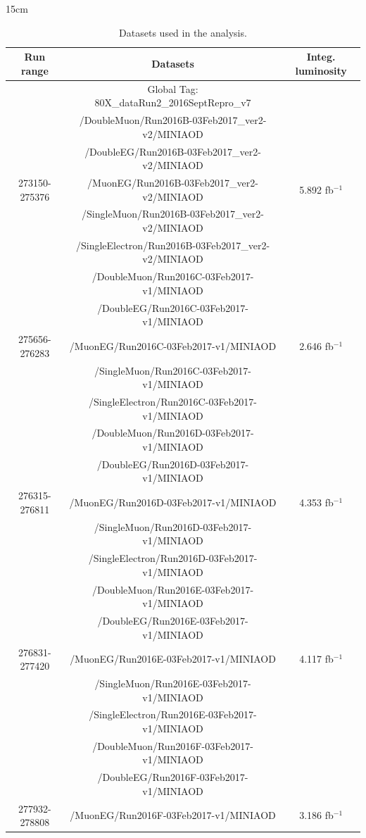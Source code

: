 \begin{table}[htbp]{15cm}
	\caption{Datasets used in the analysis.}
	\footnotesize
	\centering
	\begin{tabular}{c|c|c}
		\hline
		\rowcolor{light_gray}
		Run range & Datasets & Integ. luminosity\\
		\hline
		& Global Tag: 80X\_dataRun2\_2016SeptRepro\_v7 &\\
		\hline 
        & /DoubleMuon/Run2016B-03Feb2017\_ver2-v2/MINIAOD &\\
		& /DoubleEG/Run2016B-03Feb2017\_ver2-v2/MINIAOD	&\\
		273150-275376 & /MuonEG/Run2016B-03Feb2017\_ver2-v2/MINIAOD	& 5.892 fb$^{−1}$\\
		& /SingleMuon/Run2016B-03Feb2017\_ver2-v2/MINIAOD &\\
		& /SingleElectron/Run2016B-03Feb2017\_ver2-v2/MINIAOD &\\
		\hline
		& /DoubleMuon/Run2016C-03Feb2017-v1/MINIAOD &\\
		& /DoubleEG/Run2016C-03Feb2017-v1/MINIAOD &\\
		275656-276283 & /MuonEG/Run2016C-03Feb2017-v1/MINIAOD & 2.646 fb$^{-1}$\\
		& /SingleMuon/Run2016C-03Feb2017-v1/MINIAOD &\\
		& /SingleElectron/Run2016C-03Feb2017-v1/MINIAOD &\\
		\hline
		& /DoubleMuon/Run2016D-03Feb2017-v1/MINIAOD &\\
		& /DoubleEG/Run2016D-03Feb2017-v1/MINIAOD &\\
		276315-276811 & /MuonEG/Run2016D-03Feb2017-v1/MINIAOD & 4.353 fb$^{-1}$\\
		& /SingleMuon/Run2016D-03Feb2017-v1/MINIAOD &\\
		& /SingleElectron/Run2016D-03Feb2017-v1/MINIAOD &\\
		\hline
		& /DoubleMuon/Run2016E-03Feb2017-v1/MINIAOD &\\
		& /DoubleEG/Run2016E-03Feb2017-v1/MINIAOD &\\
		276831-277420 & /MuonEG/Run2016E-03Feb2017-v1/MINIAOD & 4.117 fb$^{-1}$\\
		& /SingleMuon/Run2016E-03Feb2017-v1/MINIAOD &\\
		& /SingleElectron/Run2016E-03Feb2017-v1/MINIAOD &\\
		\hline
		& /DoubleMuon/Run2016F-03Feb2017-v1/MINIAOD &\\
		& /DoubleEG/Run2016F-03Feb2017-v1/MINIAOD &\\
		277932-278808 & /MuonEG/Run2016F-03Feb2017-v1/MINIAOD & 3.186 fb$^{-1}$\\

\end{tabular}
\end{table}
